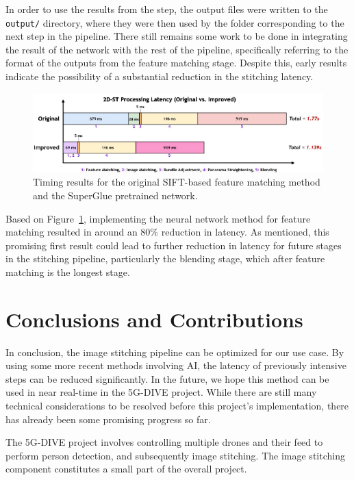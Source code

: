 \documentclass[12pt, a4paper]{article}
\begin{document}
In order to use the results from the step, the output files were written to the \texttt{output/}
directory, where they were then used by the folder corresponding to the next step in the 
pipeline. There still remains some work to be done in integrating the result of the network
with the rest of the pipeline, specifically referring to the format of the outputs from the 
feature matching stage. Despite this, early results indicate the possibility of a substantial
reduction in the stitching latency.

\begin{figure}
	\centering
	\label{fig:TimingComparison_comp}
	\includegraphics[scale=0.6]{timing_comp.png}
	\caption{Timing results for the original SIFT-based feature matching method and the 
		SuperGlue pretrained network.}
\end{figure}

Based on Figure~\ref{fig:TimingComparison_comp}, implementing the neural network method for
feature matching resulted in around an $80\%$ reduction in latency. As mentioned, this 
promising first result could lead to further reduction in latency for future stages in the
stitching pipeline, particularly the blending stage, which after feature matching is the 
longest stage.

\section{Conclusions and Contributions}
\label{sec:Conclusion}
In conclusion, the image stitching pipeline can be optimized for our use case. By using some
more recent methods involving AI, the latency of previously intensive steps can be reduced 
significantly. In the future, we hope this method can be used in near real-time in the 5G-DIVE
project. While there are still many technical considerations to be resolved before this 
project's implementation, there has already been some promising progress so far.

The 5G-DIVE project involves controlling multiple drones and their feed to perform person
detection, and subsequently image stitching. The image stitching component constitutes a small
part of the overall project. 
\end{document}
